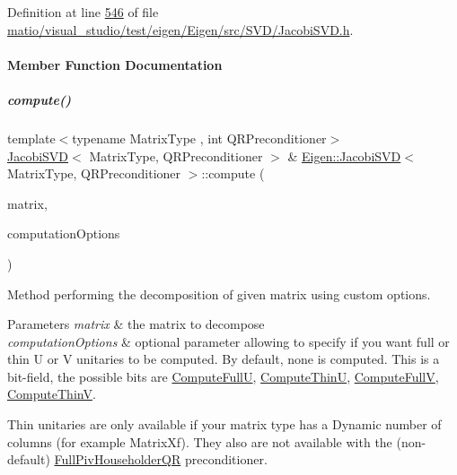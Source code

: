Definition at line \hyperlink{matio_2visual__studio_2test_2eigen_2_eigen_2src_2_s_v_d_2_jacobi_s_v_d_8h_source_l00546}{546} of file \hyperlink{matio_2visual__studio_2test_2eigen_2_eigen_2src_2_s_v_d_2_jacobi_s_v_d_8h_source}{matio/visual\+\_\+studio/test/eigen/\+Eigen/src/\+S\+V\+D/\+Jacobi\+S\+V\+D.\+h}.



\paragraph{Member Function Documentation}
\mbox{\label{group___s_v_d___module_a5dab376cc86cf0d36674bcdad4af3f5a}} 
\subparagraph{\texorpdfstring{compute()}{compute()}\hspace{0.1cm}{\footnotesize\ttfamily [1/4]}}
{\footnotesize\ttfamily template$<$typename Matrix\+Type , int Q\+R\+Preconditioner$>$ \\
\hyperlink{group___s_v_d___module_class_eigen_1_1_jacobi_s_v_d}{Jacobi\+S\+VD}$<$ Matrix\+Type, Q\+R\+Preconditioner $>$ \& \hyperlink{group___s_v_d___module_class_eigen_1_1_jacobi_s_v_d}{Eigen\+::\+Jacobi\+S\+VD}$<$ Matrix\+Type, Q\+R\+Preconditioner $>$\+::compute (\begin{DoxyParamCaption}\item[{const Matrix\+Type \&}]{matrix,  }\item[{unsigned int}]{computation\+Options }\end{DoxyParamCaption})}



Method performing the decomposition of given matrix using custom options. 


\begin{DoxyParams}{Parameters}
{\em matrix} & the matrix to decompose \\
\hline
{\em computation\+Options} & optional parameter allowing to specify if you want full or thin U or V unitaries to be computed. By default, none is computed. This is a bit-\/field, the possible bits are \hyperlink{group__enums_ggae3e239fb70022eb8747994cf5d68b4a9a2b4f91ca5859a4159dbfe8090043817f}{Compute\+FullU}, \hyperlink{group__enums_ggae3e239fb70022eb8747994cf5d68b4a9af8c742a1aa87773e165eae406c9ccaf8}{Compute\+ThinU}, \hyperlink{group__enums_ggae3e239fb70022eb8747994cf5d68b4a9a52c6f7e80bbf9a42297c88f700245b51}{Compute\+FullV}, \hyperlink{group__enums_ggae3e239fb70022eb8747994cf5d68b4a9a1055e53fa95c8ae04a07ebb72cfafd95}{Compute\+ThinV}.\\
\hline
\end{DoxyParams}
Thin unitaries are only available if your matrix type has a Dynamic number of columns (for example Matrix\+Xf). They also are not available with the (non-\/default) \hyperlink{group___q_r___module_class_eigen_1_1_full_piv_householder_q_r}{Full\+Piv\+Householder\+QR} preconditioner. 

